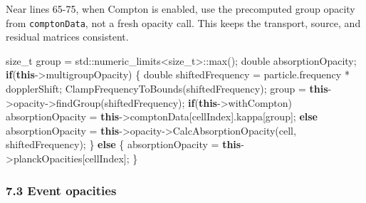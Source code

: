 \documentclass[
]{article}
\newenvironment{Shaded}{}{}
\newcommand{\BuiltInTok}[1]{\textcolor[rgb]{0.00,0.50,0.00}{#1}}
\newcommand{\ControlFlowTok}[1]{\textcolor[rgb]{0.00,0.44,0.13}{\textbf{#1}}}
\newcommand{\DataTypeTok}[1]{\textcolor[rgb]{0.56,0.13,0.00}{#1}}
\newcommand{\KeywordTok}[1]{\textcolor[rgb]{0.00,0.44,0.13}{\textbf{#1}}}
\newcommand{\NormalTok}[1]{#1}
\newcommand{\OperatorTok}[1]{\textcolor[rgb]{0.40,0.40,0.40}{#1}}
\begin{document}
Near lines 65-75, when Compton is enabled, use the precomputed group
opacity from \texttt{comptonData}, not a fresh opacity call. This keeps
the transport, source, and residual matrices consistent.

\begin{Shaded}
\begin{Highlighting}[]
\DataTypeTok{size\_t}\NormalTok{ group }\OperatorTok{=} \BuiltInTok{std::}\NormalTok{numeric\_limits}\OperatorTok{\textless{}}\DataTypeTok{size\_t}\OperatorTok{\textgreater{}::}\NormalTok{max}\OperatorTok{();}
\DataTypeTok{double}\NormalTok{ absorptionOpacity}\OperatorTok{;}
\ControlFlowTok{if}\OperatorTok{(}\KeywordTok{this}\OperatorTok{{-}\textgreater{}}\NormalTok{multigroupOpacity}\OperatorTok{)}
\OperatorTok{\{}
    \DataTypeTok{double}\NormalTok{ shiftedFrequency }\OperatorTok{=}\NormalTok{ particle}\OperatorTok{.}\NormalTok{frequency }\OperatorTok{*}\NormalTok{ dopplerShift}\OperatorTok{;}
\NormalTok{    ClampFrequencyToBounds}\OperatorTok{(}\NormalTok{shiftedFrequency}\OperatorTok{);}
\NormalTok{    group }\OperatorTok{=} \KeywordTok{this}\OperatorTok{{-}\textgreater{}}\NormalTok{opacity}\OperatorTok{{-}\textgreater{}}\NormalTok{findGroup}\OperatorTok{(}\NormalTok{shiftedFrequency}\OperatorTok{);}
    \ControlFlowTok{if}\OperatorTok{(}\KeywordTok{this}\OperatorTok{{-}\textgreater{}}\NormalTok{withCompton}\OperatorTok{)}
\NormalTok{        absorptionOpacity }\OperatorTok{=} \KeywordTok{this}\OperatorTok{{-}\textgreater{}}\NormalTok{comptonData}\OperatorTok{[}\NormalTok{cellIndex}\OperatorTok{].}\NormalTok{kappa}\OperatorTok{[}\NormalTok{group}\OperatorTok{];}
    \ControlFlowTok{else}
\NormalTok{        absorptionOpacity }\OperatorTok{=} \KeywordTok{this}\OperatorTok{{-}\textgreater{}}\NormalTok{opacity}\OperatorTok{{-}\textgreater{}}\NormalTok{CalcAbsorptionOpacity}\OperatorTok{(}\NormalTok{cell}\OperatorTok{,}\NormalTok{ shiftedFrequency}\OperatorTok{);}
\OperatorTok{\}}
\ControlFlowTok{else}
\OperatorTok{\{}
\NormalTok{    absorptionOpacity }\OperatorTok{=} \KeywordTok{this}\OperatorTok{{-}\textgreater{}}\NormalTok{planckOpacities}\OperatorTok{[}\NormalTok{cellIndex}\OperatorTok{];}
\OperatorTok{\}}
\end{Highlighting}
\end{Shaded}

\subsubsection{7.3 Event opacities}\label{event-opacities}
\end{document}
